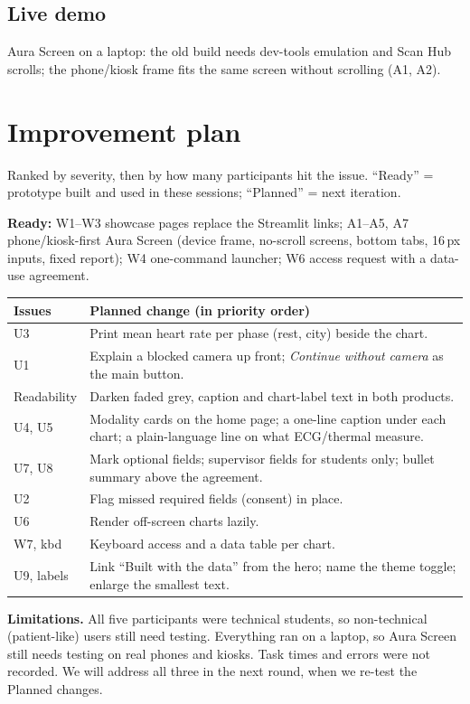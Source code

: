 \documentclass[10pt,a4paper,twocolumn]{article}
\begin{document}
\subsection{Live demo}
Aura Screen on a laptop: the old build needs dev-tools emulation and Scan Hub scrolls;
the phone/kiosk frame fits the same screen without scrolling (A1, A2).

\section{Improvement plan}
Ranked by severity, then by how many participants hit the issue. ``Ready'' =
prototype built and used in these sessions; ``Planned'' = next iteration.

\textbf{Ready:} W1--W3 showcase pages replace the Streamlit links; A1--A5, A7
phone/kiosk-first Aura Screen (device frame, no-scroll screens, bottom tabs,
16\,px inputs, fixed report); W4 one-command launcher; W6 access request with a
data-use agreement.

\begin{center}\footnotesize
\begin{tabularx}{\columnwidth}{@{}p{1.25cm}X@{}}
\toprule
Issues & Planned change (in priority order) \\
\midrule
U3 & Print mean heart rate per phase (rest, city) beside the chart. \\
U1 & Explain a blocked camera up front; \emph{Continue without camera} as the main
  button. \\
Readability & Darken faded grey, caption and chart-label text in both products. \\
U4, U5 & Modality cards on the home page; a one-line caption under each chart; a
  plain-language line on what ECG/thermal measure. \\
U7, U8 & Mark optional fields; supervisor fields for students only; bullet summary
  above the agreement. \\
U2 & Flag missed required fields (consent) in place. \\
U6 & Render off-screen charts lazily. \\
W7, kbd & Keyboard access and a data table per chart. \\
U9, labels & Link ``Built with the data'' from the hero; name the theme toggle;
  enlarge the smallest text. \\
\bottomrule
\end{tabularx}
\end{center}
\textbf{Limitations.} All five participants were technical students, so
non-technical (patient-like) users still need testing. Everything ran on a laptop,
so Aura Screen still needs testing on real phones and kiosks. Task times and errors
were not recorded. We will address all three in the next round, when we re-test the
Planned changes.
\end{document}
